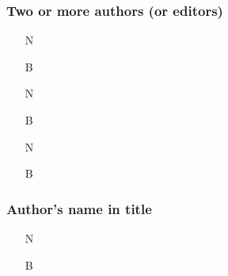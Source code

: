 \documentclass[11pt,letterpaper,oneside]{article}
\begin{document}
\subsubsection{Two or more authors (or editors)}
\label{14.76}

\begin{itemize}
\item[N] 

\item[B] 

\item[N] 

\item[B] 

\item[N] 

\item[B] 
\end{itemize}

\setcounter{subsubsection}{77}
\subsubsection{Author's name in title}
\label{14.78}

\begin{itemize}
\item[N] 

\item[B] 


\end{itemize}


\end{document}
